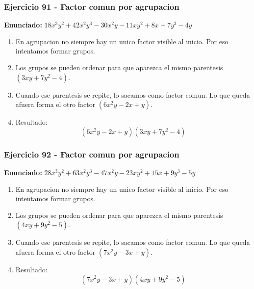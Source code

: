 \documentclass[11pt,a4paper]{article}
\begin{document}
\subsubsection*{Ejercicio 91 - Factor comun por agrupacion}
\textbf{Enunciado:} $ 18 x^{3} y^{2} + 42 x^{2} y^{3} - 30 x^{2} y - 11 x y^{2} + 8 x + 7 y^{3} - 4 y $\par
\begin{enumerate}[leftmargin=2em]
\item En agrupacion no siempre hay un unico factor visible al inicio. Por eso intentamos formar grupos.
\item Los grupos se pueden ordenar para que aparezca el mismo parentesis \((3 x y + 7 y^{2} - 4)\).
\item Cuando ese parentesis se repite, lo sacamos como factor comun. Lo que queda afuera forma el otro factor \((6 x^{2} y - 2 x + y)\).
\item Resultado: \[\boxed{\left(6 x^{2} y - 2 x + y\right)\left(3 x y + 7 y^{2} - 4\right)}\]
\end{enumerate}

\vspace{0.2cm}
\subsubsection*{Ejercicio 92 - Factor comun por agrupacion}
\textbf{Enunciado:} $ 28 x^{3} y^{2} + 63 x^{2} y^{3} - 47 x^{2} y - 23 x y^{2} + 15 x + 9 y^{3} - 5 y $\par
\begin{enumerate}[leftmargin=2em]
\item En agrupacion no siempre hay un unico factor visible al inicio. Por eso intentamos formar grupos.
\item Los grupos se pueden ordenar para que aparezca el mismo parentesis \((4 x y + 9 y^{2} - 5)\).
\item Cuando ese parentesis se repite, lo sacamos como factor comun. Lo que queda afuera forma el otro factor \((7 x^{2} y - 3 x + y)\).
\item Resultado: \[\boxed{\left(7 x^{2} y - 3 x + y\right)\left(4 x y + 9 y^{2} - 5\right)}\]
\end{enumerate}

\vspace{0.2cm}
\end{document}

